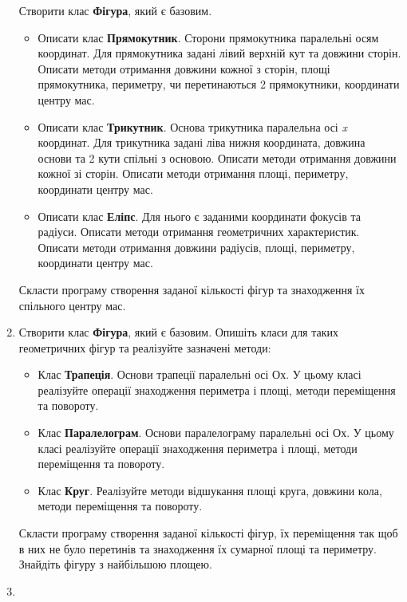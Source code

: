 \documentclass[a5paper,titlepage,openany,twoside,
]
{book_unv}%
\begin{document}
\begin{enumerate}
Створити клас \textbf{Фігура}, який є базовим.
\begin{itemize}
\item
Описати клас \textbf{Прямокутник}. Сторони прямокутника паралельні осям
координат. Для прямокутника задані лівий верхній кут та довжини сторін.
Описати методи отримання довжини кожної з сторін, площі прямокутника,
периметру, чи перетинаються 2 прямокутники, координати центру мас. 
\item
Описати клас \textbf{Трикутник}. Основа трикутника паралельна осі
\emph{x} координат. Для трикутника задані ліва нижня координата,
довжина основи та 2 кути спільні з основою. Описати методи отримання довжини кожної зі сторін.
Описати методи отримання площі, периметру, координати центру мас.  
\item
Описати клас \textbf{Еліпс}. Для нього є заданими координати фокусів та радіуси.
Описати методи отримання геометричних характеристик. Описати методи
отримання довжини радіусів, площі, периметру, координати центру мас. 
\end{itemize}

Скласти програму створення заданої кількості фігур та знаходження їх спільного центру мас.


\item
Створити клас \textbf{Фігура}, який є базовим.  Опишіть класи для 
таких геометричних фігур та реалізуйте зазначені методи:
\begin{itemize}
\item
  Клас \textbf{Трапеція}. Основи трапеції паралельні осі Ох. У цьому класі реалізуйте операції 
знаходження периметра і площі, методи переміщення та повороту.
\item
  Клас \textbf{Паралелограм}. Основи паралелограму паралельні осі Ох. 
У цьому класі реалізуйте операції знаходження периметра і площі, 
методи переміщення та повороту.
\item
  Клас \textbf{Круг}. Реалізуйте методи відшукання площі круга, довжини кола,
  методи переміщення та повороту.
\end{itemize}
Скласти програму створення заданої кількості фігур, їх переміщення так щоб в них не було
перетинів та знаходження їх сумарної площі та периметру. 
Знайдіть фігуру з найбільшою площею.


\item


\end{enumerate}
\end{document}
